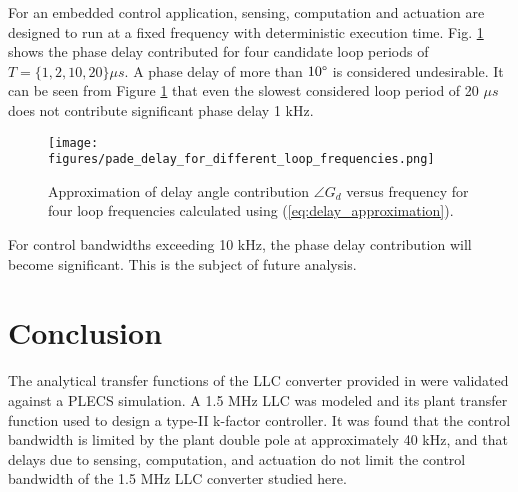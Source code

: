 \documentclass[journal]{IEEEtran}
\begin{document}
For an embedded control application, sensing, computation and actuation are designed to run at a fixed frequency with deterministic execution time.
Fig. \ref{fig:pade_delay_for_different_loop_frequencies} shows the phase delay contributed for four candidate loop periods of $T = \{1, 2, 10, 20\} \mu s$.
A phase delay of more than $10\degree$ is considered undesirable.
It can be seen from Figure \ref{fig:pade_delay_for_different_loop_frequencies} that even the slowest considered loop period of 20 $\mu s$ does not contribute significant phase delay 1 kHz.

\begin{figure}
  \texttt{[image: figures/pade\_delay\_for\_different\_loop\_frequencies.png]}
  \caption{Approximation of delay angle contribution $\angle G_d$ versus frequency for four loop frequencies calculated using (\ref{eq:delay_approximation}).}
  \label{fig:pade_delay_for_different_loop_frequencies}
\end{figure}

For control bandwidths exceeding 10 kHz, the phase delay contribution will become significant. This is the subject of future analysis.

\section{Conclusion}

The analytical transfer functions of the LLC converter provided in \cite{tian_equivalent_2020} were validated against a PLECS simulation.
A 1.5 MHz LLC was modeled and its plant transfer function used to design a type-II k-factor controller.
It was found that the control bandwidth is limited by the plant double pole at approximately 40 kHz, and that delays due to sensing, computation, and actuation do not limit the control bandwidth of the 1.5 MHz LLC converter studied here.


%
\end{document}
